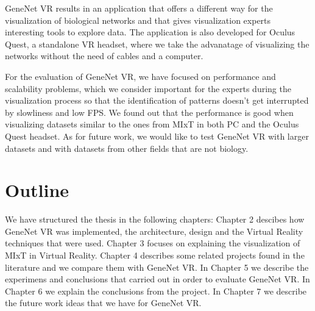 GeneNet VR results in an application that offers a different way for the visualization of biological networks and that gives visualization experts interesting tools to explore data. The application is also developed for Oculus Quest, a standalone VR headset, where we take the advanatage of visualizing the networks without the need of cables and a computer.

For the evaluation of GeneNet VR, we have focused on performance and scalability problems, which we consider important for the experts during the visualization process so that the identification of patterns doesn't get interrupted by slowliness and low FPS. We found out that the performance is good when visualizing datasets similar to the ones from MIxT in both PC and the Oculus Quest headset. As for future work, we would like to test GeneNet VR with larger datasets and with datasets from other fields that are not biology.

\section{Outline}

We have structured the thesis in the following chapters: Chapter 2 descibes how GeneNet VR was implemented, the architecture, design and the Virtual Reality techniques that were used. Chapter 3 focuses on explaining the visualization of MIxT in Virtual Reality. Chapter 4 describes some related projects found in the literature and we compare them with GeneNet VR. In Chapter 5 we describe the experimens and conclusions that carried out in order to evaluate GeneNet VR. In Chapter 6 we explain the conclusions from the project. In Chapter 7 we describe the future work ideas that we have for GeneNet VR.
